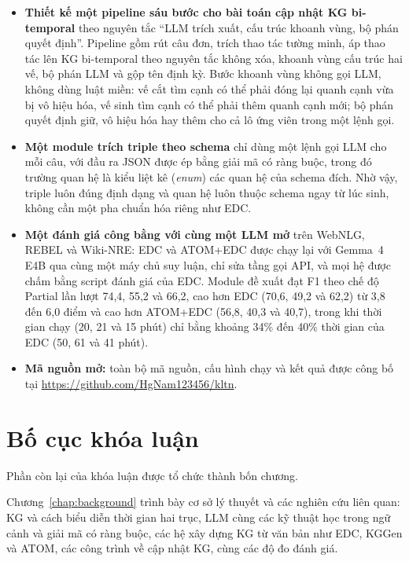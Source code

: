 \begin{itemize}
  \item \textbf{Thiết kế một pipeline sáu bước cho bài toán cập nhật KG bi-temporal}
  theo nguyên tắc ``LLM trích xuất, cấu trúc khoanh vùng, bộ phán quyết định''.
  Pipeline gồm rút câu đơn, trích thao tác tường minh, áp thao tác lên KG bi-temporal theo nguyên tắc không xóa,
  khoanh vùng cấu trúc hai vế, bộ phán LLM và gộp tên định kỳ.
  Bước khoanh vùng không gọi LLM, không dùng luật miền: vế cắt tìm cạnh có thể phải đóng lại quanh cạnh vừa bị vô hiệu hóa,
  vế sinh tìm cạnh có thể phải thêm quanh cạnh mới; bộ phán quyết định giữ, vô hiệu hóa hay thêm cho cả lô ứng viên trong một lệnh gọi.

  \item \textbf{Một module trích triple theo schema} chỉ dùng một lệnh gọi LLM cho mỗi câu,
  với đầu ra JSON được ép bằng giải mã có ràng buộc, trong đó trường quan hệ là kiểu liệt kê (\textit{enum}) các quan hệ của schema đích.
  Nhờ vậy, triple luôn đúng định dạng và quan hệ luôn thuộc schema ngay từ lúc sinh, không cần một pha chuẩn hóa riêng như EDC.

  \item \textbf{Một đánh giá công bằng với cùng một LLM mở} trên WebNLG, REBEL và Wiki-NRE:
  EDC và ATOM+EDC được chạy lại với Gemma~4 E4B qua cùng một máy chủ suy luận, chỉ sửa tầng gọi API,
  và mọi hệ được chấm bằng script đánh giá của EDC.
  Module đề xuất đạt F1 theo chế độ Partial lần lượt 74,4, 55,2 và 66,2,
  cao hơn EDC (70,6, 49,2 và 62,2) từ 3,8 đến 6,0 điểm và cao hơn ATOM+EDC (56,8, 40,3 và 40,7),
  trong khi thời gian chạy (20, 21 và 15 phút) chỉ bằng khoảng 34\% đến 40\% thời gian của EDC (50, 61 và 41 phút).

  \item \textbf{Mã nguồn mở:} toàn bộ mã nguồn, cấu hình chạy và kết quả được công bố tại
  \url{https://github.com/HgNam123456/kltn}.
\end{itemize}

\section{Bố cục khóa luận}
\label{sec:intro-outline}

Phần còn lại của khóa luận được tổ chức thành bốn chương.

Chương~\ref{chap:background} trình bày cơ sở lý thuyết và các nghiên cứu liên quan:
KG và cách biểu diễn thời gian hai trục, LLM cùng các kỹ thuật học trong ngữ cảnh và giải mã có ràng buộc,
các hệ xây dựng KG từ văn bản như EDC, KGGen và ATOM, các công trình về cập nhật KG, cùng các độ đo đánh giá.

